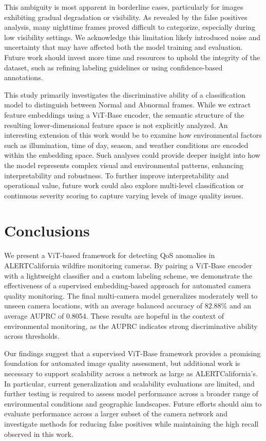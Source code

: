 \documentclass[remotesensing,article,submit,moreauthors]{Definitions/mdpi}
\begin{document}
This ambiguity is most apparent in borderline cases, particularly for images exhibiting gradual degradation or visibility. As revealed by the false positives analysis, many nighttime frames proved difficult to categorize, especially during low visibility settings. We acknowledge this limitation likely introduced noise and uncertainty that may have affected both the model training and evaluation. Future work should invest more time and resources to uphold the integrity of the dataset, such as refining labeling guidelines or using confidence-based annotations. 

This study primarily investigates the discriminative ability of a classification model to distinguish between Normal and Abnormal frames. While we extract feature embeddings using a \ac{ViT}-Base encoder, the semantic structure of the resulting lower-dimensional feature space is not explicitly analyzed. An interesting extension of this work would be to examine how environmental factors such as illumination, time of day, season, and weather conditions are encoded within the embedding space. Such analyses could provide deeper insight into how the model represents complex visual and environmental patterns, enhancing interpretability and robustness. To further improve interpretability and operational value, future work could also explore multi-level classification or continuous severity scoring to capture varying levels of image quality issues. 

\section{Conclusions}

We present a \ac{ViT}-based framework for detecting \ac{QoS} anomalies in ALERTCalifornia wildfire monitoring cameras. By pairing a \ac{ViT}-Base encoder with a lightweight classifier and a custom labeling scheme, we demonstrate the effectiveness of a supervised embedding-based approach for automated camera quality monitoring. The final multi-camera model generalizes moderately well to unseen camera locations, with an average balanced accuracy of $82.88\%$ and an average \ac{AUPRC} of 0.8054. These results are hopeful in the context of environmental monitoring, as the \ac{AUPRC} indicates strong discriminative ability across thresholds.

Our findings suggest that a supervised \ac{ViT}-Base framework provides a promising foundation for automated image quality assessment, but additional work is necessary to support scalability across a network as large as ALERTCalifornia's. In particular, current generalization and scalability evaluations are limited, and further testing is required to assess model performance across a broader range of environmental conditions and geographic landscapes. Future efforts should aim to evaluate performance across a larger subset of the camera network and investigate methods for reducing false positives while maintaining the high recall observed in this work. 
\end{document}
